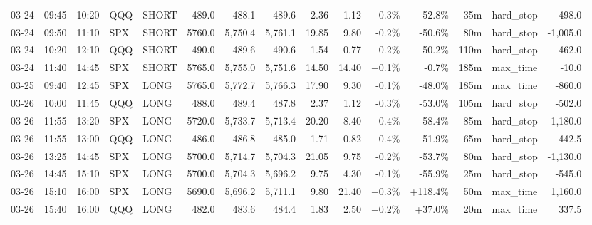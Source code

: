 \documentclass[11pt,a4paper,twoside]{article}
\begin{document}
\begin{landscape}
\begin{center}
\begin{longtable}{>{\color{txtmain}}l l l l l r r r r r r r r >{\color{txtmain}}l r}
03-24 & 09:45 & 10:20 & QQQ & SHORT & 489.0 & 488.1 & 489.6 & 2.36 & 1.12 & \textcolor{lossred}{-0.3\%} & \textcolor{lossred}{-52.8\%} & 35m & hard\_stop & \textcolor{lossred}{-498.0} \\
03-24 & 09:50 & 11:10 & SPX & SHORT & 5760.0 & 5,750.4 & 5,761.1 & 19.85 & 9.80 & \textcolor{lossred}{-0.2\%} & \textcolor{lossred}{-50.6\%} & 80m & hard\_stop & \textcolor{lossred}{-1,005.0} \\
03-24 & 10:20 & 12:10 & QQQ & SHORT & 490.0 & 489.6 & 490.6 & 1.54 & 0.77 & \textcolor{lossred}{-0.2\%} & \textcolor{lossred}{-50.2\%} & 110m & hard\_stop & \textcolor{lossred}{-462.0} \\
03-24 & 11:40 & 14:45 & SPX & SHORT & 5765.0 & 5,755.0 & 5,751.6 & 14.50 & 14.40 & \textcolor{wingreen}{+0.1\%} & \textcolor{lossred}{-0.7\%} & 185m & max\_time & \textcolor{lossred}{-10.0} \\
03-25 & 09:40 & 12:45 & SPX & LONG & 5765.0 & 5,772.7 & 5,766.3 & 17.90 & 9.30 & \textcolor{lossred}{-0.1\%} & \textcolor{lossred}{-48.0\%} & 185m & max\_time & \textcolor{lossred}{-860.0} \\
03-26 & 10:00 & 11:45 & QQQ & LONG & 488.0 & 489.4 & 487.8 & 2.37 & 1.12 & \textcolor{lossred}{-0.3\%} & \textcolor{lossred}{-53.0\%} & 105m & hard\_stop & \textcolor{lossred}{-502.0} \\
03-26 & 11:55 & 13:20 & SPX & LONG & 5720.0 & 5,733.7 & 5,713.4 & 20.20 & 8.40 & \textcolor{lossred}{-0.4\%} & \textcolor{lossred}{-58.4\%} & 85m & hard\_stop & \textcolor{lossred}{-1,180.0} \\
03-26 & 11:55 & 13:00 & QQQ & LONG & 486.0 & 486.8 & 485.0 & 1.71 & 0.82 & \textcolor{lossred}{-0.4\%} & \textcolor{lossred}{-51.9\%} & 65m & hard\_stop & \textcolor{lossred}{-442.5} \\
03-26 & 13:25 & 14:45 & SPX & LONG & 5700.0 & 5,714.7 & 5,704.3 & 21.05 & 9.75 & \textcolor{lossred}{-0.2\%} & \textcolor{lossred}{-53.7\%} & 80m & hard\_stop & \textcolor{lossred}{-1,130.0} \\
03-26 & 14:45 & 15:10 & SPX & LONG & 5700.0 & 5,704.3 & 5,696.2 & 9.75 & 4.30 & \textcolor{lossred}{-0.1\%} & \textcolor{lossred}{-55.9\%} & 25m & hard\_stop & \textcolor{lossred}{-545.0} \\
03-26 & 15:10 & 16:00 & SPX & LONG & 5690.0 & 5,696.2 & 5,711.1 & 9.80 & 21.40 & \textcolor{wingreen}{+0.3\%} & \textcolor{wingreen}{+118.4\%} & 50m & max\_time & \textcolor{wingreen}{1,160.0} \\
03-26 & 15:40 & 16:00 & QQQ & LONG & 482.0 & 483.6 & 484.4 & 1.83 & 2.50 & \textcolor{wingreen}{+0.2\%} & \textcolor{wingreen}{+37.0\%} & 20m & max\_time & \textcolor{wingreen}{337.5} \\

\end{longtable}
\end{center}
\end{landscape}
\end{document}
